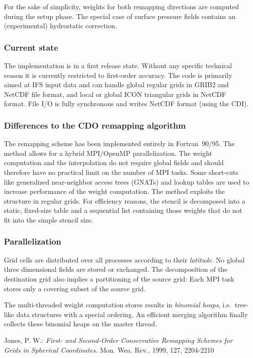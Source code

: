 \documentclass[a4paper,10pt, DIV14]{scrartcl}
\begin{document}
For the sake of simplicity, weights for both remapping directions are
computed during the setup phase.
The special case of surface pressure fields contains an (experimental) hydrostatic correction.


\subsubsection*{Current state}

The implementation is in a first release state.
Without any specific technical reason it is currently restricted to first-order accuracy.
The code is primarily aimed at IFS input data and can handle global regular grids in
GRIB2 and NetCDF file format, and local or global ICON triangular grids in NetCDF format.
File I/O is fully synchronous and writes NetCDF format (using the CDI).


\subsubsection*{Differences to the CDO remapping algorithm}

The remapping scheme has been implemented entirely in Fortran~90/95.
The method allows for a hybrid MPI/OpenMP parallelization.
The weight computation and the interpolation do not require global fields
and should therefore have no practical limit on the number of MPI tasks.
Some short-cuts like generalized near-neighbor access trees (GNATs) and
lookup tables are used to increase performance of the weight computation.
The method exploits the structure in regular grids.
For efficiency reasons, the stencil is decomposed into a static, fixed-size
table and a sequential list containing those weights that do not fit into
the simple stencil size.


\subsubsection*{Parallelization}

Grid cells are distributed over all processes according to their \emph{latitude}.
No global three dimensional fields are stored or exchanged.
The decomposition of the destination grid also implies a partitioning of the
source grid:
Each MPI task stores only a covering subset  of the source grid.

The multi-threaded weight computation stores results in \emph{binomial heaps}, i.e.\ tree-like
data structures with a special ordering.
An efficient merging algorithm finally collects these binomial heaps on the master thread.


 
\begin{thebibliography}{1}
   Jones, P. W.: 
                      \emph{First- and Second-Order Conservative Remapping Schemes for Grids in Spherical Coordinates.}
                      Mon. Wea. Rev., 1999, 127, 2204-2210
\end{thebibliography}
\end{document}
